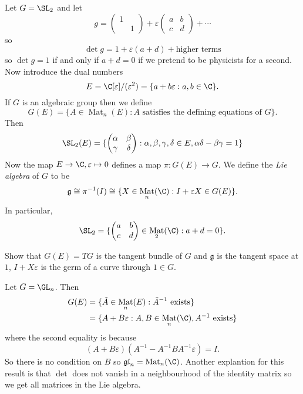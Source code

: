\documentclass[a4paper]{article}
\DeclareMathOperator{\Mat}{Mat}
\newcommand*{\Lie}[1]{\mathfrak{#1}} %
\begin{document}
\begin{eg}
  Let \(G = \SL_2\) and let
  \[
    g =
    \begin{pmatrix}
      1 & \\
      & 1
    \end{pmatrix}
    + \varepsilon
    \begin{pmatrix}
      a & b \\
      c & d
    \end{pmatrix}
    + \cdots
  \]
  so
  \[
    \det g = 1 + \varepsilon(a + d) + \text{higher terms}
  \]
  so \(\det g = 1\) if and only if \(a + d = 0\) if we pretend to be physicists for a second. Now introduce the dual numbers
  \[
    E = \C[\varepsilon]/(\varepsilon^2) = \{a + b \varepsilon: a, b \in \C\}.
  \]
  If \(G\) is an algebraic group then we define
  \[
    G(E) = \{A \in \Mat_n(E): A \text{ satisfies the defining equations of } G\}.
  \]
  Then
  \[
    \SL_2(E) = \{
    \begin{pmatrix}
      \alpha & \beta \\
      \gamma & \delta
    \end{pmatrix}
    : \alpha, \beta, \gamma, \delta \in E, \alpha \delta - \beta \gamma = 1\}
  \]
  Now the map \(E \to \C, \varepsilon \mapsto 0\) defines a map \(\pi: G(E) \to G\). We define the \emph{Lie algebra} of \(G\) to be
  \[
    \Lie g \cong \pi^{-1}(I) \cong \{X \in \Mat_n(\C): I + \varepsilon X \in G(E)\}.
  \]
  In particular,
  \[
    \SL_2 = \{
    \begin{pmatrix}
      a & b \\
      c & d
    \end{pmatrix}
    \in \Mat_2(\C): a + d = 0\}.
  \]
\end{eg}

\begin{ex}
  Show that \(G(E) = TG\) is the tangent bundle of \(G\) and \(\Lie g\) is the tangent space at \(1\), \(I + X \varepsilon\) is the germ of a curve through \(1 \in G\).
\end{ex}

\begin{eg}
  Let \(G = \GL_n\). Then
  \begin{align*}
    G(E) &= \{\tilde A \in \Mat_n(E): \tilde A^{-1} \text{ exists}\} \\
         &= \{A + B \varepsilon: A, B \in \Mat_n(\C), A^{-1} \text{ exists}\}
  \end{align*}
  where the second equality is because
  \[
    (A + B \varepsilon) (A^{-1} - A^{-1}B A^{-1} \varepsilon) = I.
  \]
  So there is no condition on \(B\) so \(\Lie{gl}_n = \Mat_n(\C)\). Another explantion for this result is that \(\det\) does not vanish in a neighbourhood of the identity matrix so we get all matrices in the Lie algebra.
\end{eg}
\end{document}
